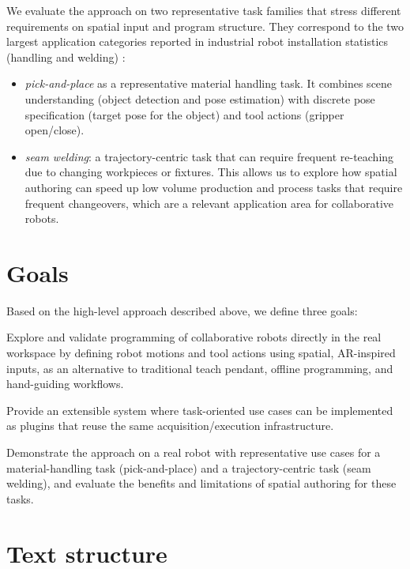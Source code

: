We evaluate the approach on two representative task families that stress different requirements on spatial input and program structure. They correspond to the two largest application categories reported in industrial robot installation statistics (handling and welding) \cite{IFRWorldRobotics2023Extended}:
\begin{itemize}
    \item \emph{pick-and-place} as a representative material handling task. It combines scene understanding (object detection and pose estimation) with discrete pose specification (target pose for the object) and tool actions (gripper open/close).
    
    \item \emph{seam welding}: a trajectory-centric task that can require frequent re-teaching due to changing workpieces or fixtures. This allows us to explore how spatial authoring can speed up low volume production and process tasks that require frequent changeovers, which are a relevant application area for collaborative robots.
\end{itemize}


\section*{Goals}

Based on the high-level approach described above, we define three goals:
\begin{goals}
  \item \label{goal:1} Explore and validate programming of collaborative robots directly in the real workspace by defining robot motions and tool actions using spatial, AR-inspired inputs, as an alternative to traditional teach pendant, offline programming, and hand-guiding workflows.
  \item \label{goal:2} Provide an extensible system where task-oriented use cases can be implemented as plugins that reuse the same acquisition/execution infrastructure.
  \item \label{goal:3} Demonstrate the approach on a real robot with representative use cases for a material-handling task (pick-and-place) and a trajectory-centric task (seam welding), and evaluate the benefits and limitations of spatial authoring for these tasks.
\end{goals}


\section*{Text structure}


